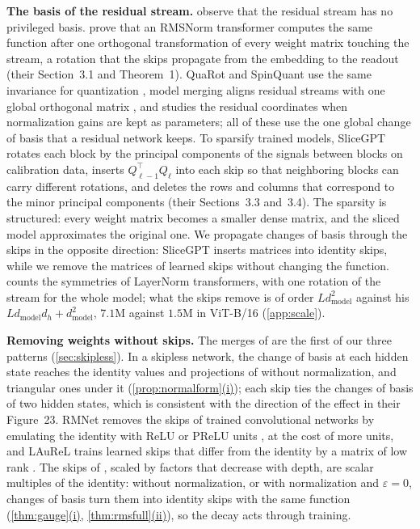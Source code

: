 \documentclass[10pt]{article}
\theoremstyle{definition}
\theoremstyle{remark}
\newcommand{\dm}{d_{\mathrm{model}}}
\newcommand{\para}[1]{\smallskip\noindent\textbf{#1}\hspace{0.5em}}
\DeclareRobustCommand{\cpref}[2]{\hyperref[#1:#2]{\cref*{#1}(#2)}}
\begin{document}
\para{The basis of the residual stream.} \citet{elhage2021circuits} observe that the residual stream has no privileged basis. \citet{ashkboos2024slicegpt} prove that an RMSNorm transformer computes the same function after one orthogonal transformation of every weight matrix touching the stream, a rotation that the skips propagate from the embedding to the readout (their Section~3.1 and Theorem~1). QuaRot and SpinQuant use the same invariance for quantization \citep{ashkboos2024quarot,liu2024spinquant}, model merging aligns residual streams with one global orthogonal matrix \citep{theus2025glmc}, and \citet{sweeney2026transport} studies the residual coordinates when normalization gains are kept as parameters; all of these use the one global change of basis that a residual network keeps. To sparsify trained models, SliceGPT rotates each block by the principal components of the signals between blocks on calibration data, inserts $Q_{\ell-1}^\top Q_\ell$ into each skip so that neighboring blocks can carry different rotations, and deletes the rows and columns that correspond to the minor principal components (their Sections~3.3 and~3.4). The sparsity is structured: every weight matrix becomes a smaller dense matrix, and the sliced model approximates the original one. We propagate changes of basis through the skips in the opposite direction: SliceGPT inserts matrices into identity skips, while we remove the matrices of learned skips without changing the function. \citet[Sections~4.4 and~4.5]{vannierop2024gauge} counts the symmetries of LayerNorm transformers, with one rotation of the stream for the whole model; what the skips remove is of order $L\dm^2$ against his $L\dm d_h + \dm^2$, $7.1$M against $1.5$M in ViT-B/16 (\cref{app:scale}).

\para{Removing weights without skips.} The merges of \citet{graef2024tricks} are the first of our three patterns (\cref{sec:skipless}). In a skipless network, the change of basis at each hidden state reaches the identity values and projections of \citet{he2024simplifying} without normalization, and triangular ones under it (\cpref{prop:normalform}{i}); each skip ties the changes of basis of two hidden states, which is consistent with the direction of the effect in their Figure~23. RMNet removes the skips of trained convolutional networks by emulating the identity with ReLU or PReLU units \citep{meng2021rmnet}, at the cost of more units, and LAuReL trains learned skips that differ from the identity by a matrix of low rank \citep{menghani2024laurel}. The skips of \citet{zhang2026residual}, scaled by factors that decrease with depth, are scalar multiples of the identity: without normalization, or with normalization and $\varepsilon = 0$, changes of basis turn them into identity skips with the same function (\cpref{thm:gauge}{i}, \cpref{thm:rmsfull}{ii}), so the decay acts through training.
\end{document}
